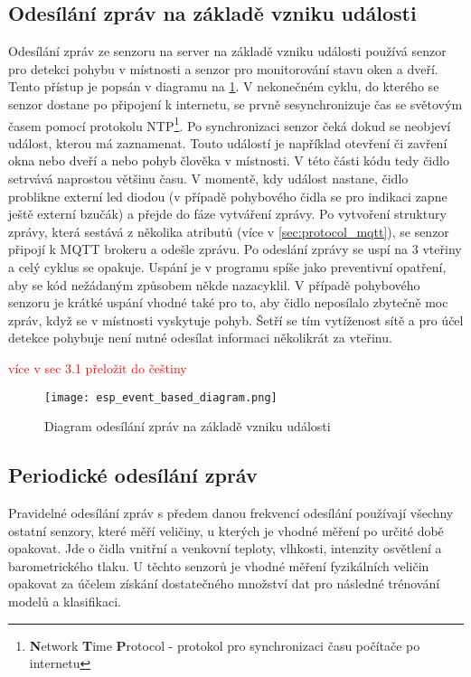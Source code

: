  \subsection*{Odesílání zpráv na základě vzniku události}
Odesílání zpráv ze senzoru na server na základě vzniku události používá senzor pro detekci pohybu v místnosti a senzor pro monitorování stavu oken a dveří. Tento přístup je popsán v diagramu na \cref{fig:esp_event_based_diagram}. V nekonečném cyklu, do kterého se senzor dostane po připojení k internetu, se prvně sesynchronizuje čas se světovým časem pomocí protokolu NTP\footnote{\textbf{N}etwork \textbf{T}ime \textbf{P}rotocol - protokol pro synchronizaci času počítače po internetu}. Po synchronizaci senzor čeká dokud se neobjeví událost, kterou má zaznamenat. Touto událostí je například otevření či zavření okna nebo dveří a nebo pohyb člověka v místnosti. V této části kódu tedy čidlo setrvává naprostou většinu času. V momentě, kdy událost nastane, čidlo problikne externí led diodou (v případě pohybového čidla se pro indikaci zapne ještě externí bzučák) a přejde do fáze vytváření zprávy. Po vytvoření struktury zprávy, která sestává z několika atributů (více v \cref{sec:protocol_mqtt}), se senzor připojí k MQTT brokeru a odešle zprávu. Po odeslání zprávy se uspí na 3 vteřiny a celý cyklus se opakuje. Uspání je v programu spíše jako preventivní opatření, aby se kód nežádaným způsobem někde nazacyklil. V případě pohybového senzoru je krátké uspání vhodné také pro to, aby čidlo neposílalo zbytečně moc zpráv, když se v místnosti vyskytuje pohyb. Šetří se tím vytíženost sítě a pro účel detekce pohybuje není nutné odesílat informaci několikrát za vteřinu.

\textcolor{red}{více v sec 3.1 přeložit do češtiny}

\begin{figure}[H]
  \centering
  \texttt{[image: esp\_event\_based\_diagram.png]}
  \caption{Diagram odesílání zpráv na základě vzniku události}
  \label{fig:esp_event_based_diagram}
\end{figure} 
 
 \subsection*{Periodické odesílání zpráv}
Pravidelné odesílání zpráv s předem danou frekvencí odesílání používají všechny ostatní senzory, které měří veličiny, u kterých je vhodné měření po určité době opakovat. Jde o čidla vnitřní a venkovní teploty, vlhkosti, intenzity osvětlení a barometrického tlaku. U těchto senzorů je vhodné měření fyzikálních veličin opakovat za účelem získání dostatečného množství dat pro následné trénování modelů a klasifikaci. 

